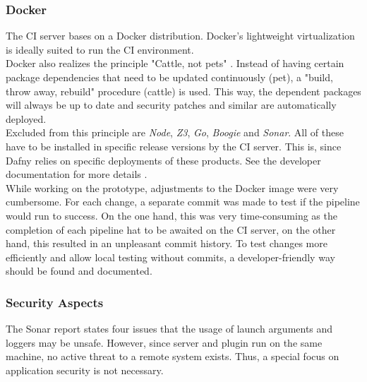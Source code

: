 \subsubsection{Docker}
The CI server bases on a Docker distribution.
Docker's lightweight virtualization is ideally suited to run the CI environment. \\

Docker also realizes the principle "Cattle, not pets" \cite{pets-vs-cattle}.
Instead of having certain package dependencies that need to be updated continuously (pet), a "build, throw away, rebuild" procedure (cattle) is used.
This way, the dependent packages will always be up to date and security patches and similar are automatically deployed.\\

Excluded from this principle are \textit{Node}, \textit{Z3}, \textit{Go}, \textit{Boogie} and \textit{Sonar}.    
All of these have to be installed in specific release versions by the CI server.
This is, since Dafny relies on specific deployments of these products.
See the developer documentation for more details \cite{dev}.\\

While working on the prototype, adjustments to the Docker image were very cumbersome.
For each change, a separate commit was made to test if the pipeline would run to success.
On the one hand, this was very time-consuming as the completion of each pipeline hat to be awaited on the CI server,
on the other hand, this resulted in an unpleasant commit history.
To test changes more efficiently and allow local testing without commits,
a developer-friendly way should be found and documented.

\subsubsection{Security Aspects}
The Sonar report states four issues that the usage of launch arguments and loggers may be unsafe.
However, since server and plugin run on the same machine, no active threat to a remote system exists.
Thus, a special focus on application security is not necessary.
